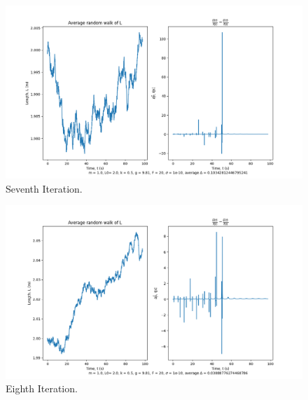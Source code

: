 \documentclass[10pt, twocolumn]{article}
\begin{document}
\begin{figure}[H]
    \centering
    \includegraphics[width = \columnwidth]{Projects/ForcedSimplePendulum/Plots/simplified m = 1.0, L0= 2.0, k = 0.5, g = 9.81, F = 20, sigma = 1e-10, run number 6.png}
    \caption{Seventh Iteration.}
    \label{fig:enter-label}
\end{figure}

\begin{figure}[H]
    \centering
    \includegraphics[width = \columnwidth]{Projects/ForcedSimplePendulum/Plots/simplified m = 1.0, L0= 2.0, k = 0.5, g = 9.81, F = 20, sigma = 1e-10, run number 7.png}
    \caption{Eighth Iteration.}
    \label{fig:enter-label}
\end{figure}
\end{document}
